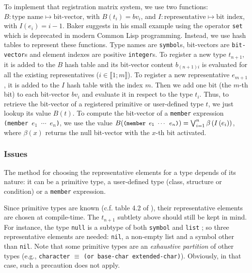 \documentclass[format=sigconf]{acmart}
\newcommand\intvl[1]{\llbracket#1\rrbracket}
\newcommand\code[2][\small]{\sloppy\texttt{#1#2}}
\newcommand\mcode[2][\small]{\text{\code[#1]{#2}}}
\theoremstyle{definition}
\begin{document}
To implement that registration matrix system, we use two functions:
\sloppy${B : \text{type name} \longmapsto \text{bit-vector}}$,
with $B(t_i) = bv_i$, and
\sloppy${I : \text{representative} \longmapsto \text{bit index}}$,
with $I(e_i) = i - 1$.
Baker suggests in his small example \cite{baker1992} using the operator
\code{set} which is deprecated in modern Common Lisp programming. Instead, we
use hash tables to represent these functions. Type names are \code{symbol}s,
bit-vectors are \code{bit-vector}s and element indexes are positive
\code{integer}s. To register a new type $t_{n+1}$, it is added to the $B$ hash
table and its bit-vector content $b_{(n+1)i}$ is evaluated for all the existing
representatives ($i \in \intvl{1;m}$). To register a new representative
$e_{m+1}$, it is added to the $I$ hash table with the index $m$. Then we add one
bit (the $m$-th bit) to each bit-vector $bv_i$ and evaluate it in respect to the
type $t_i$. Thus, to retrieve the bit-vector of a registered primitive or
user-defined type $t$, we just lookup its value $B(t)$. To compute the
bit-vector of a \code{member} expression \code{(member $e_1$ $\cdots$ $e_n$)},
we use the value
$B(\mcode{(member $e_1$ $\cdots$ $e_n$)}) = \bigvee_{i=1}^n
\beta\left(I\left(e_i\right)\right)$,
where $\beta(x)$ returns the null bit-vector with the $x$-th bit activated.

\subsubsection{Issues}
\label{sec:issues}
The method for choosing the representative elements for a type depends of its
nature: it can be a primitive type, a user-defined type (class, structure or
condition) or a \code{member} expression.

Since primitive types are known (c.f. table 4.2 of
\cite{bib:ansi.94.cl.type-specifiers}), their representative elements are chosen
at compile-time.
The $t_{n+1}$ subtlety above should still be kept in mind. For
instance, the type \code{null} is a subtype of both \code{symbol} and
\code{list} ; so three representative elements are needed: \code{nil}, a non-empty
list and a symbol other than \code{nil}. Note that some primitive types are an
\emph{exhaustive partition} of other types (e.g., \code{character} $\equiv$
\code{(or base-char extended-char)}).
Obviously, in that case, such a precaution does not apply.
\end{document}
